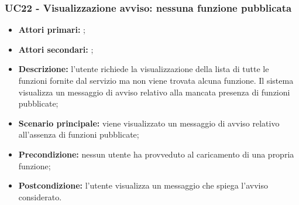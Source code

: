 \subsubsection{UC22 - Visualizzazione avviso: nessuna funzione pubblicata}
\begin{itemize}
	\item \textbf{Attori primari:} \ua{};
	\item \textbf{Attori secondari:} \re{};
	\item \textbf{Descrizione:} l’utente richiede la visualizzazione della lista di tutte le funzioni fornite dal servizio ma non viene trovata alcuna funzione. Il sistema visualizza un messaggio di avviso relativo alla mancata presenza di funzioni pubblicate; 
	\item \textbf{Scenario principale:} viene visualizzato un messaggio di avviso relativo all’assenza di funzioni pubblicate;
	\item \textbf{Precondizione:} nessun utente ha provveduto al caricamento di una propria funzione;
	\item \textbf{Postcondizione:}  l’utente visualizza un messaggio che spiega l’avviso considerato.
\end{itemize}